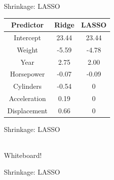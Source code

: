 \documentclass[8pt]{beamer}
\begin{document}
    \begin{frame}{Shrinkage: LASSO} %
        \centering
        \vfill
        \begin{tabular}{|c|c|c|}
            \hline
            \textbf{Predictor}&\textbf{Ridge}&\textbf{LASSO}\\
            \hline
            Intercept&23.44&23.44\\
            \hline
            Weight&-5.59&-4.78\\
            \hline
            Year&2.75&2.00\\
            \hline
            Horsepower&-0.07&-0.09\\
            \hline
            Cylinders&-0.54&0\\
            \hline
            Acceleration&0.19&0\\
            \hline
            Displacement&0.66&0\\
            \hline
        \end{tabular}
        \vfill
    \end{frame}

    \begin{frame}{Shrinkage: LASSO} %
        \centering
        \vfill
        \\
        \vspace{0.5cm}
        Whiteboard!
        \vfill
    \end{frame}

    \begin{frame}{Shrinkage: LASSO} %
        \vfill
        \centering
        \vfill
    \end{frame}
\end{document}
